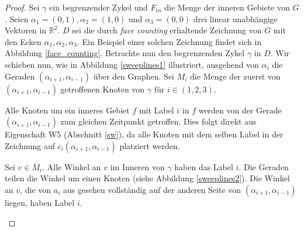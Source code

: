 \begin{proof}
Sei $\gamma$ ein begrenzender Zykel und $F_{in}$ die Menge der inneren Gebiete von $G$. Seien $\alpha_1=(0,1),\alpha_2=(1,0)$ und $\alpha_3=(0,0)$ drei linear unabhängige Vektoren in $\mathbb{R}^2$. $D$ sei die durch \textit{face counting} erhaltende Zeichnung von $G$ mit den Ecken $\alpha_1,\alpha_2,\alpha_3$. Ein Beispiel einer solchen Zeichnung findet sich in Abbildung \ref{face_counting}. Betrachte nun den begrenzenden Zykel $\gamma$ in $D$. Wir schieben nun, wie in Abbildung \ref{sweeplines1} illustriert, ausgehend von $\alpha_i$ die Geraden $(\alpha_{i+1},\alpha_{i-1})$ über den Graphen. Sei $M_i$ die Menge der zuerst von $(\alpha_{i+1},\alpha_{i-1})$ getroffenen Knoten von $\gamma$ für $i \in (1,2,3)$.

\begin{observation}\label{obs1}
Alle Knoten um ein inneres Gebiet $f$ mit Label $i$ in $f$ werden von der Gerade $(\alpha_{i+1},\alpha_{i-1})$ zum gleichen Zeitpunkt getroffen. Dies folgt direkt aus Eigenschaft W5 (Abschnitt \ref{sw}), da alle Knoten mit dem selben Label in der Zeichnung auf $c_i(\alpha_{i+1},\alpha_{i-1})$ platziert werden.
\end{observation}

\begin{observation}\label{obs2}
Sei $v \in M_i$. Alle Winkel an $v$ im Inneren von $\gamma$ haben das Label $i$. Die Geraden teilen die Winkel um einen Knoten (siehe Abbildung \ref{sweeplines2}). Die Winkel an $v$, die von $a_i$ aus gesehen vollständig auf der anderen Seite von $(\alpha_{i+1},\alpha_{i-1})$ liegen, haben Label $i$.
\end{observation}


\end{proof}
